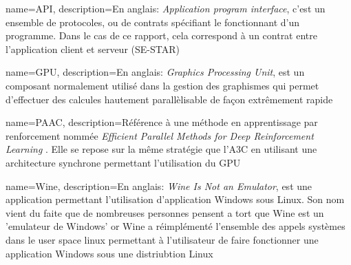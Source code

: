 
{
    name=API,
    description={En anglais: \emph{Application program interface}, c'est un ensemble de protocoles, ou de contrats spécifiant le fonctionnant d'un programme. Dans le cas de ce rapport, cela correspond à un contrat entre l'application client et serveur (SE-STAR)}
}

{
    name=GPU,
    description={En anglais: \emph{Graphics Processing Unit}, est un composant normalement utilisé dans la gestion des graphismes qui permet d'effectuer des calcules hautement parallèlisable de façon extrêmement rapide}
}

{
    name=PAAC,
    description={Référence à une méthode en apprentissage par renforcement nommée \emph{Efficient Parallel Methods for Deep Reinforcement Learning }\cite{2017arXiv170504862C}. Elle se repose sur la même stratégie que l'A3C en utilisant une architecture synchrone permettant l'utilisation du GPU} 
}

{
    name=Wine,
    description={En anglais: \emph{Wine Is Not an Emulator}, est une application permettant l'utilisation d'application Windows sous Linux. Son nom vient du faite que de nombreuses personnes pensent a tort que Wine est un 'emulateur de Windows' or Wine a réimplémenté l'ensemble des appels systèmes dans le user space linux permettant à l'utilisateur de faire fonctionner une application Windows sous une distriubtion Linux}
}




